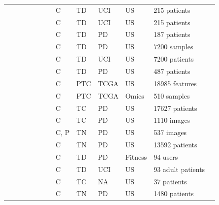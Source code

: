 \documentclass[a4paper,fleqn]{cas-sc}
\newcommand{\cmark}{\ding{51}}%
\begin{document}
\begin{table}[t!]
\begin{tabular}{
m{0.5cm}
m{0.3cm}
m{0.3cm}
m{0.3cm}
m{0.3cm}
m{0.3cm}
m{0.3cm}
m{1.3cm}
m{1.3cm}
m{1.3cm}
m{1.3cm}
m{2.3cm}
m{2.3cm}
}
\cite{li2012computer} & \cmark & & & & \cmark & & C & TD & UCI & US & 215 patients \\

\cite{ma2018efficient} & \cmark & & & & \cmark & & C & TD & UCI & US & 215 patients  \\ 

\cite{xia2017ultrasound} & \cmark & & & & \cmark & & C & TD & PD & US & 187 patients \\

\cite{rao2019thyroid} & \cmark & & & & & \cmark & C & TD & PD & US & 7200 samples  \\ 

\cite{hosseinzadeh2020multiple} & \cmark & & & & & \cmark & C & TD & UCI & US & 7200  patients \\ 

\cite{erol2008radial} & \cmark & & & & & \cmark & C & TD & PD & US & 487 patients \\ 

\cite{ferreira2018autoencoders} &  & \cmark &  & & & \cmark & C & PTC & TCGA & US & 18985 features \\ 

\cite{teixeira2017learning} &  &\cmark & & & & \cmark & C & PTC & TCGA & Omics & 510 samples \\

\cite{li2019diagnosis} &  & \cmark & \cmark & & & & C & TC & PD & US & 17627 patients \\ 

\cite{xie2019thyroid} &  & \cmark & \cmark & & & & C & TC & PD & US & 1110 images \\ 

\cite{liang2020convolutional} &  & \cmark & \cmark & & & & C, P & TN & PD & US & 537 images \\ 

\cite{chen2017thyroid} &  & \cmark & & & & \cmark & C & TN & PD & US & 13592 patients  \\ 

\cite{vairalephysical} &  & \cmark & & & & \cmark & C & TD & PD & Fitness & 94 users \\

\cite{liu2011bayesian} &  \cmark & & & & & \cmark & C & TD & UCI & US & 93 adult patients  \\ 

\cite{liu2009controlled} & & \cmark & & & & \cmark & C & TC & NA & US & 37 patients \\ 

\cite{chen2020diagnosis} & & \cmark & & & &\cmark & C & TN & PD & US & 1480 patients \\ 


\end{tabular}
\end{table}
\end{document}
